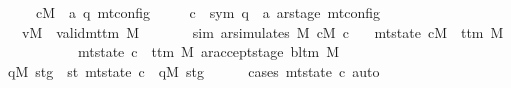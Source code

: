 \begin{isabellebody}
\ \ \ \ \ cM\ {\isacharcolon}{\kern0pt}{\isacharcolon}{\kern0pt}\ {\isachardoublequoteopen}{\isacharparenleft}{\kern0pt}{\isacharprime}{\kern0pt}a{\isacharcomma}{\kern0pt}\ {\isacharprime}{\kern0pt}q{\isacharparenright}{\kern0pt}\ mt{\isacharunderscore}{\kern0pt}config{\isachardoublequoteclose}\isanewline
\ \ \ \ \ c{\isacharprime}{\kern0pt}\ {\isacharcolon}{\kern0pt}{\isacharcolon}{\kern0pt}\ {\isachardoublequoteopen}{\isacharparenleft}{\kern0pt}sym{}{\isacharcomma}{\kern0pt}\ {\isacharprime}{\kern0pt}q\ {\isasymtimes}\ {\isacharprime}{\kern0pt}a\ ar{\isacharunderscore}{\kern0pt}stage{\isacharparenright}{\kern0pt}\ mt{\isacharunderscore}{\kern0pt}config{\isachardoublequoteclose}\isanewline
\ \ \ vM{\isacharcolon}{\kern0pt}\ \ {\isachardoublequoteopen}valid{\isacharunderscore}{\kern0pt}mttm\ M{\isachardoublequoteclose}\isanewline
\ \ \ \ \ \ \ sim{\isacharcolon}{\kern0pt}\ {\isachardoublequoteopen}ar{\isacharunderscore}{\kern0pt}simulates\ M\ cM\ c{\isacharprime}{\kern0pt}{\isachardoublequoteclose}\isanewline
\ \ \ {\isachardoublequoteopen}{\isacharparenleft}{\kern0pt}mt{\isacharunderscore}{\kern0pt}state\ cM\ {\isacharequal}{\kern0pt}\ t{\isacharunderscore}{\kern0pt}tm\ M{\isacharparenright}{\kern0pt}\isanewline
\ \ \ \ \ \ \ \ \ \ {\isasymlongleftrightarrow}\ {\isacharparenleft}{\kern0pt}mt{\isacharunderscore}{\kern0pt}state\ c{\isacharprime}{\kern0pt}\ {\isacharequal}{\kern0pt}\ {\isacharparenleft}{\kern0pt}t{\isacharunderscore}{\kern0pt}tm\ M{\isacharcomma}{\kern0pt}\ ar{\isacharunderscore}{\kern0pt}accept{\isacharunderscore}{\kern0pt}stage\ {\isacharparenleft}{\kern0pt}bl{\isacharunderscore}{\kern0pt}tm\ M{\isacharparenright}{\kern0pt}{\isacharparenright}{\kern0pt}{\isacharparenright}{\kern0pt}{\isachardoublequoteclose}\isanewline
%
\isadelimproof
%
\endisadelimproof
%
\isatagproof
{}\isamarkupfalse%
\ {\isacharminus}{\kern0pt}\isanewline
\ \ \isamarkupfalse%
\ qM{\isacharprime}{\kern0pt}\ stg\ \ st{\isacharcolon}{\kern0pt}\ {\isachardoublequoteopen}mt{\isacharunderscore}{\kern0pt}state\ c{\isacharprime}{\kern0pt}\ {\isacharequal}{\kern0pt}\ {\isacharparenleft}{\kern0pt}qM{\isacharprime}{\kern0pt}{\isacharcomma}{\kern0pt}\ stg{\isacharparenright}{\kern0pt}{\isachardoublequoteclose}\isanewline
\ \ \ \ \isamarkupfalse%
\ {\isacharparenleft}{\kern0pt}cases\ {\isachardoublequoteopen}mt{\isacharunderscore}{\kern0pt}state\ c{\isacharprime}{\kern0pt}{\isachardoublequoteclose}{\isacharparenright}{\kern0pt}\ auto\isanewline

\end{isabellebody}

